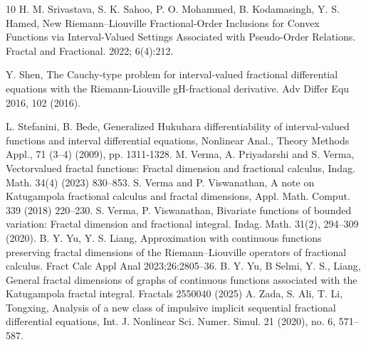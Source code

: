 \documentclass[a4paper,12pt,reqno]{amsart}
\numberwithin{equation}{section}
\theoremstyle{definition}
\theoremstyle{remark}
\numberwithin{equation}{section}
\begin{document}
\begin{thebibliography}{10}
 H. M. Srivastava, S. K. Sahoo, P. O. Mohammed, B. Kodamasingh, Y. S. Hamed, New Riemann–Liouville Fractional-Order Inclusions for Convex Functions via Interval-Valued Settings Associated with Pseudo-Order Relations. Fractal and Fractional. 2022; 6(4):212.


 Y. Shen, The Cauchy-type problem for interval-valued fractional differential equations with the Riemann-Liouville gH-fractional derivative. Adv Differ Equ 2016, 102 (2016).


 L. Stefanini, B. Bede, Generalized Hukuhara differentiability of interval-valued functions and interval differential equations, Nonlinear Anal., Theory Methods Appl., 71 (3–4) (2009), pp. 1311-1328.
 M. Verma, A. Priyadarshi and S. Verma, Vectorvalued fractal functions: Fractal dimension and fractional calculus, Indag. Math. 34(4) (2023) 830–853.
 S. Verma and P. Viswanathan, A note on Katugampola fractional calculus and fractal dimensions,
Appl. Math. Comput. 339 (2018) 220–230.
 S. Verma, P. Viswanathan, Bivariate functions of bounded variation: Fractal dimension and fractional
integral. Indag. Math. 31(2), 294–309 (2020).
 B. Y. Yu, Y. S. Liang, Approximation with continuous functions preserving fractal dimensions of the Riemann–Liouville operators of fractional calculus. Fract Calc Appl Anal 2023;26:2805–36.
 B. Y. Yu, B Selmi, Y. S., Liang, General fractal dimensions of graphs of continuous functions associated with the Katugampola fractal integral. Fractals 2550040 (2025)
 A. Zada, S. Ali,  T. Li, Tongxing, Analysis of a new class of impulsive implicit sequential fractional differential equations, Int. J. Nonlinear Sci. Numer. Simul. 21 (2020), no. 6, 571–587.

\end{thebibliography}
	
 
\end{document}
